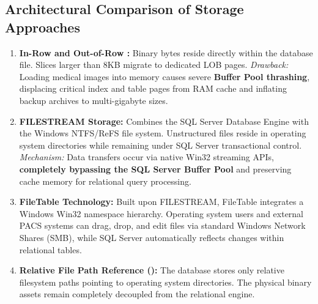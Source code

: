 \subsection{Architectural Comparison of Storage Approaches}
\begin{enumerate}
    \item \textbf{In-Row and Out-of-Row :} Binary bytes reside directly within the  database file. Slices larger than 8KB migrate to dedicated LOB pages. 
    \textit{Drawback:} Loading medical images into memory causes severe \textbf{Buffer Pool thrashing}, displacing critical index and table pages from RAM cache and inflating backup archives to multi-gigabyte sizes.
    \item \textbf{FILESTREAM Storage:} Combines the SQL Server Database Engine with the Windows NTFS/ReFS file system. Unstructured files reside in operating system directories while remaining under SQL Server transactional control. 
    \textit{Mechanism:} Data transfers occur via native Win32 streaming APIs, \textbf{completely bypassing the SQL Server Buffer Pool} and preserving cache memory for relational query processing.
    \item \textbf{FileTable Technology:} Built upon FILESTREAM, FileTable integrates a Windows Win32 namespace hierarchy. Operating system users and external PACS systems can drag, drop, and edit  files via standard Windows Network Shares (SMB), while SQL Server automatically reflects changes within relational tables.
    \item \textbf{Relative File Path Reference ():} The database stores only relative filesystem paths pointing to operating system directories. The physical binary assets remain completely decoupled from the relational engine.
\end{enumerate}

